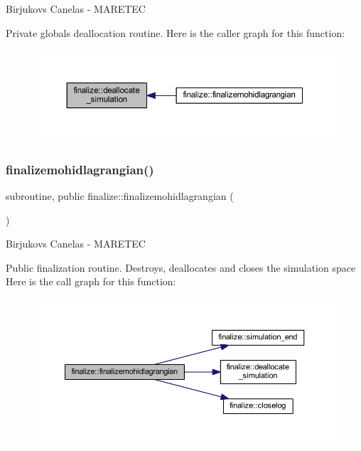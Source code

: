 Birjukovs Canelas -\/ M\+A\+R\+E\+T\+EC 

Private globals deallocation routine. Here is the caller graph for this function\+:
\nopagebreak
\begin{figure}[H]
\begin{center}
\leavevmode
\includegraphics[width=350pt]{namespacefinalize_a2b6733e6db5a768ac96ad9274685ad43_icgraph}
\end{center}
\end{figure}
\mbox{\label{namespacefinalize_a57aceaa0eb3b16c1942dd2cb013010e4}} 
\subsubsection{\texorpdfstring{finalizemohidlagrangian()}{finalizemohidlagrangian()}}
{\footnotesize\ttfamily subroutine, public finalize\+::finalizemohidlagrangian (\begin{DoxyParamCaption}{ }\end{DoxyParamCaption})}



Birjukovs Canelas -\/ M\+A\+R\+E\+T\+EC 

Public finalization routine. Destroys, deallocates and closes the simulation space Here is the call graph for this function\+:
\nopagebreak
\begin{figure}[H]
\begin{center}
\leavevmode
\includegraphics[width=350pt]{namespacefinalize_a57aceaa0eb3b16c1942dd2cb013010e4_cgraph}
\end{center}
\end{figure}
\mbox{\label{namespacefinalize_a57fbc96712f416103b529ff969479250}} 
